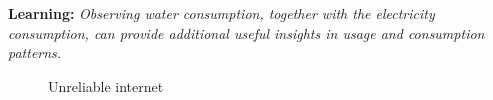 \documentclass[10pt]{sensys-proc}
\begin{document}
\textbf{Learning:} \emph{Observing water consumption, together with the electricity consumption, can provide additional useful insights in usage and consumption patterns.}
\begin{figure} [t!]
\vspace{-4mm}
        \vspace{-3mm}
  \caption{Unreliable internet}
  \vspace{-2mm}
  
      \label{fig:unreliable_internet}
\end{figure}
\end{document}
